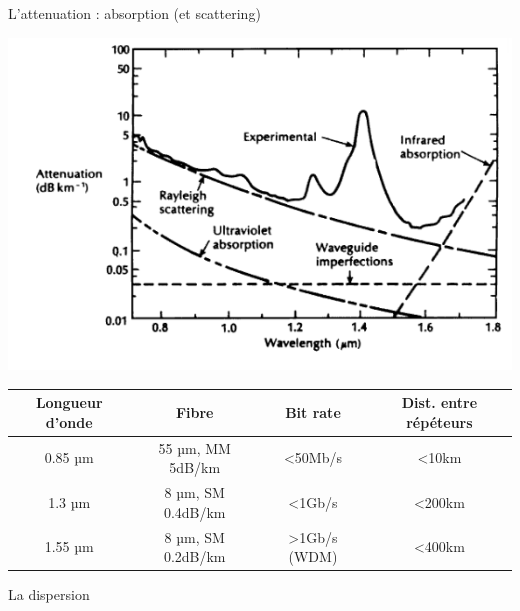 \documentclass[aspectratio=149, 10pt, t]{beamer}
\begin{document}
\begin{frame}{L'attenuation : absorption (et scattering)}

    \centering
    \includegraphics[width=0.5\linewidth]{images/absorption_fibre.png}

    \begin{tabular}{cccc}
        \hline
        Longueur d'onde & Fibre & Bit rate & Dist. entre répéteurs \\
        \hline
        0.85 µm & 55 µm, MM 5dB/km& <50Mb/s & <10km \\
        1.3 µm & 8 µm, SM 0.4dB/km& <1Gb/s & <200km \\
        1.55 µm & 8 µm, SM 0.2dB/km& >1Gb/s (WDM)& <400km \\
    \hline
    \end{tabular}

\end{frame}

\begin{frame}{La dispersion}
    \centering
\end{frame}
\end{document}
